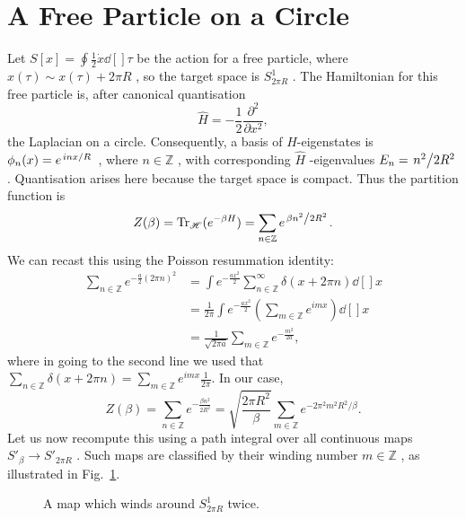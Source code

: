 
\section{A Free Particle on a Circle}%
\label{sec:a_free_particle_on_a_circle}

Let $S[x] = \oint \frac{1}{2} \dot{x} \dd[]{\tau}$ be the action for a free particle, where $x(\tau) \sim x(\tau) + 2\pi R$ , so the target space is $S^1_{2\pi R}$ .
The Hamiltonian for this free particle is, after canonical quantisation
\begin{equation}
  \hat{H} = -\frac{1}{2} \frac{\partial^2}{\partial x^2},
\end{equation}
the Laplacian on a circle.
Consequently, a basis of $\hat{H}$-eigenstates is $\phi_n(x) = e^{\flatfrac{i n x}{R}}$ , where $n \in \mathbb{Z}$ , with corresponding $\hat{H}$ -eigenvalues $E_n = \flatfrac{n^2}{2R^2}$.
Quantisation arises here because the target space is compact.
Thus the partition function is
\begin{equation}
  Z(\beta) = \Tr_{\mathscr{H}} (e^{-\beta H}) = \sum_{n \in \mathbb{Z}} e^{\flatfrac{\beta n^2}{2 R^2}}.
\end{equation}
We can recast this using the Poisson resummation identity:
\begin{align}
  \sum_{n \in \mathbb{Z}} e^{- \frac{a}{2}(2\pi n)^2} &= \int e^{-\frac{ax^2}{2}} \sum_{n \in \mathbb{Z}}^{\infty} \delta(x + 2 \pi n) \dd[]{x} \\
						      &= \frac{1}{2\pi} \int e^{-\frac{ax^2}{2}} (\sum_{m\in \mathbb{Z}} e^{imx}) \dd[]{x} \\
						      &= \frac{1}{\sqrt{2\pi a}} \sum_{m \in \mathbb{Z}} e^{-\frac{m^2}{2a}},
\end{align}
where in going to the second line we used that $\sum_{n \in \mathbb{Z}} \delta(x + 2 \pi n) = \sum_{m \in \mathbb{Z}} e^{imx} \frac{1}{2\pi}$.
In our case, 
\begin{equation}
  Z(\beta) = \sum_{n\in \mathbb{Z}} e^{-\frac{\beta n^2}{2R^2}} = \sqrt{\frac{2\pi R^2}{\beta}} \sum_{m\in \mathbb{Z}} e^{-2 \pi^2 m^2 R^2 / \beta}.
\end{equation}
Let us now recompute this using a path integral over all continuous maps $S'_\beta \to S'_{2\pi R}$ . Such maps are classified by their winding number $m \in \mathbb{Z}$ , as illustrated in Fig.~\ref{fig:l6f1}.
\begin{figure}[tbhp]
  \centering
  \def\svgwidth{0.4\columnwidth}
  
  \caption{A map which winds around $S^1_{2\pi R}$ twice.}
  \label{fig:l6f1}
\end{figure}
